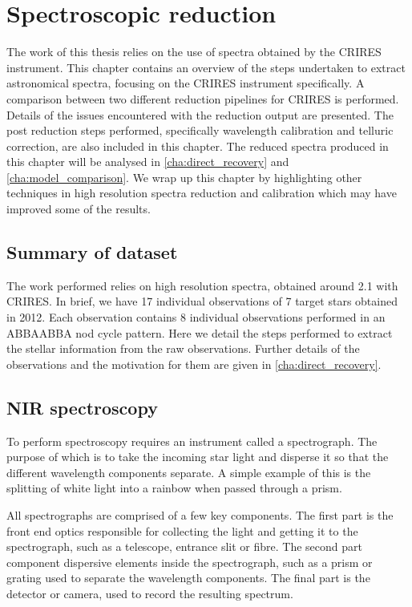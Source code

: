 
\chapter{Spectroscopic reduction} %
\label{cha:reduction}

The work of this thesis relies on the use of \nir{} spectra obtained by the {CRIRES} instrument.
This chapter contains an overview of the steps undertaken to extract astronomical spectra, focusing on the {CRIRES} instrument specifically.
A comparison between two different reduction pipelines for {CRIRES} is performed.
Details of the issues encountered with the reduction output are presented.
The post reduction steps performed, specifically wavelength calibration and telluric correction, are also included in this chapter.
The reduced spectra produced in this chapter will be analysed in \cref{cha:direct_recovery} and \cref{cha:model_comparison}.
We wrap up this chapter by highlighting other techniques in high resolution \nir{} spectra reduction and calibration which may have improved some of the results.

\section{Summary of dataset}
\todo{}{}
The work performed relies on high resolution \nir{} spectra, obtained around 2.1\um{} with {CRIRES}.
In brief, we have 17 individual observations of 7 target stars obtained in 2012.
Each observation contains 8 individual observations performed in an {ABBAABBA} nod cycle pattern.
Here we detail the steps performed to extract the stellar information from the raw observations.
Further details of the observations and the motivation for them are given in \cref{cha:direct_recovery}.


\section{NIR spectroscopy}
To perform spectroscopy requires an instrument called a spectrograph. The purpose of which is to take the incoming star light and disperse it so that the different wavelength components separate. A simple example of this is the splitting of white light into a rainbow when passed through a prism.

All spectrographs are comprised of a few key components.
The first part is the front end optics responsible for collecting the light and getting it to the spectrograph, such as a telescope, entrance slit or fibre.
The second part component dispersive elements inside the spectrograph, such as a prism or grating used to separate the wavelength components.
The final part is the detector or camera, used to record the resulting spectrum.

